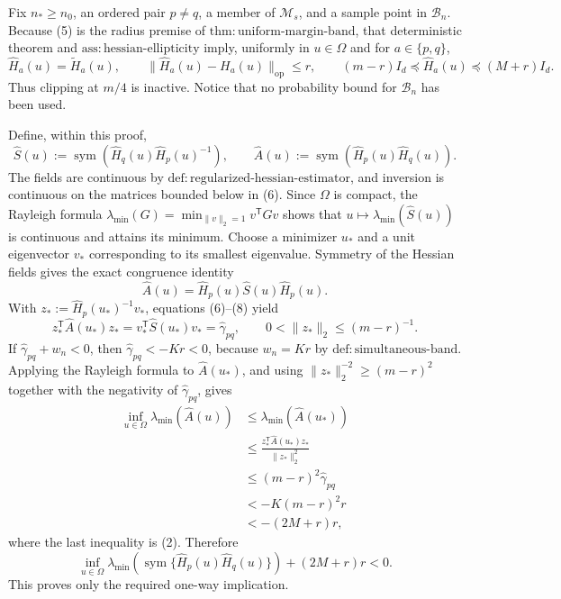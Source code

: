 Fix \(n_\ast\ge n_0\), an ordered pair \(p\ne q\), a member of \(\mathcal M_s\), and a sample point in \(\mathcal B_n\).  Because (5) is the radius premise of \(\mathrm{thm:uniform\text{-}margin\text{-}band}\), that deterministic theorem and \(\mathrm{ass:hessian\text{-}ellipticity}\) imply, uniformly in \(u\in\Omega\) and for \(a\in\{p,q\}\),
\[
 \widehat H_a(u)=\widetilde H_a(u),
 \qquad
 \lVert\widehat H_a(u)-H_a(u)\rVert_{\mathrm{op}}\le r,
 \qquad
 (m-r)I_d\preceq\widehat H_a(u)\preceq(M+r)I_d.
 \tag{6}
\]
Thus clipping at \(m/4\) is inactive.  Notice that no probability bound for \(\mathcal B_n\) has been used.

Define, within this proof,
\[
 \widehat S(u):=\operatorname{sym}\!\left(
   \widehat H_q(u)\widehat H_p(u)^{-1}\right),
 \qquad
 \widehat A(u):=\operatorname{sym}\!\left(
   \widehat H_p(u)\widehat H_q(u)\right).
 \tag{7}
\]
The fields are continuous by \(\mathrm{def:regularized\text{-}hessian\text{-}estimator}\), and inversion is continuous on the matrices bounded below in (6).  Since \(\Omega\) is compact, the Rayleigh formula
\(\lambda_{\min}(G)=\min_{\lVert v\rVert_2=1}v^{\mathsf T}Gv\) shows that \(u\mapsto\lambda_{\min}(\widehat S(u))\) is continuous and attains its minimum.  Choose a minimizer \(u_\ast\) and a unit eigenvector \(v_\ast\) corresponding to its smallest eigenvalue.  Symmetry of the Hessian fields gives the exact congruence identity
\[
 \widehat A(u)=\widehat H_p(u)\widehat S(u)\widehat H_p(u).
 \tag{8}
\]
With \(z_\ast:=\widehat H_p(u_\ast)^{-1}v_\ast\), equations (6)--(8) yield
\[
 z_\ast^{\mathsf T}\widehat A(u_\ast)z_\ast
 =v_\ast^{\mathsf T}\widehat S(u_\ast)v_\ast
 =\widehat\gamma_{pq},
 \qquad
 0<\lVert z_\ast\rVert_2\le(m-r)^{-1}.
 \tag{9}
\]
If \(\widehat\gamma_{pq}+w_n<0\), then \(\widehat\gamma_{pq}<-Kr<0\), because \(w_n=Kr\) by \(\mathrm{def:simultaneous\text{-}band}\).  Applying the Rayleigh formula to \(\widehat A(u_\ast)\), and using \(\lVert z_\ast\rVert_2^{-2}\ge(m-r)^2\) together with the negativity of \(\widehat\gamma_{pq}\), gives
\[
 \begin{aligned}
 \inf_{u\in\Omega}\lambda_{\min}(\widehat A(u))
 &\le \lambda_{\min}(\widehat A(u_\ast))\\
 &\le
 \frac{z_\ast^{\mathsf T}\widehat A(u_\ast)z_\ast}
      {\lVert z_\ast\rVert_2^2}\\
 &\le(m-r)^2\widehat\gamma_{pq}\\
 &<-K(m-r)^2r\\
 &<-(2M+r)r,
 \end{aligned}
 \tag{10}
\]
where the last inequality is (2).  Therefore
\[
 \inf_{u\in\Omega}\lambda_{\min}\!\left(
 \operatorname{sym}\{\widehat H_p(u)\widehat H_q(u)\}\right)
 +(2M+r)r<0.
 \tag{11}
\]
This proves only the required one-way implication.


